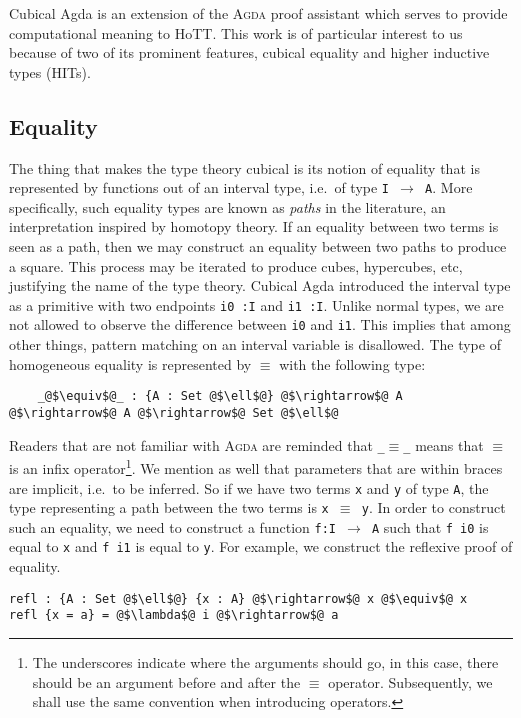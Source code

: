 \documentclass[12pt,twoside,maitrise]{dms}
\theoremstyle{definition}
\numberwithin{equation}{section}
\numberwithin{table}{chapter}
\numberwithin{figure}{chapter}
\newcommand\id[1] {\texttt{#1}}
\newcommand\fn[1] {\texttt{#1}}
\def\Agda{\textsc{Agda}\xspace}
\begin{document}
Cubical Agda\cite{vezzosi2021cubical} is an extension of the \Agda{} proof
assistant which serves to provide computational meaning to HoTT. This work is
of particular interest to us because of two of its prominent features, cubical
equality and higher inductive types (HITs).

\subsection{Equality}
The thing that makes the type theory cubical is its notion of equality that is
represented by functions out of an interval type, i.e.\ of type \fn{I
  $\rightarrow$ A}. More specifically, such equality types are known as
\emph{paths} in the literature, an interpretation inspired by homotopy theory.
If an equality between two terms is seen as a path, then we may construct an
equality between two paths to produce a square. This process may be iterated to
produce cubes, hypercubes, etc, justifying the name of the type theory. Cubical
Agda introduced the interval type as a primitive with two endpoints \fn{i0
  :\@ I} and \fn{i1 :\@ I}. Unlike normal types, we are not allowed to
observe the difference between \id{i0} and \id{i1}. This implies that among
other things, pattern matching on an interval variable is disallowed. The type
of homogeneous equality is represented by $\equiv$ with the following type:

\begin{verbatim}
    _@$\equiv$@_ : {A : Set @$\ell$@} @$\rightarrow$@ A @$\rightarrow$@ A @$\rightarrow$@ Set @$\ell$@
\end{verbatim}

Readers that are not familiar with \Agda{} are reminded that \fn{\_$\equiv$\_}
means that $\equiv$ is an infix operator\footnote{The underscores indicate where
the arguments should go, in this case, there should be an argument before and
after the $\equiv$ operator. Subsequently, we shall use the same convention when
introducing operators.}. We mention as well that parameters that are within
braces are implicit, i.e.\ to be inferred. So if we have two terms \id{x} and
\id{y} of type \id{A}, the type representing a path between the two terms is
\fn{x $\equiv$ y}. In order to construct such an equality, we need to construct
a function \id{f:I $\rightarrow$ A} such that \fn{f i0} is equal to \id{x} and
\fn{f i1} is equal to \id{y}. For example, we construct the reflexive proof of
equality.

\begin{verbatim}
refl : {A : Set @$\ell$@} {x : A} @$\rightarrow$@ x @$\equiv$@ x
refl {x = a} = @$\lambda$@ i @$\rightarrow$@ a
\end{verbatim}
\end{document}
